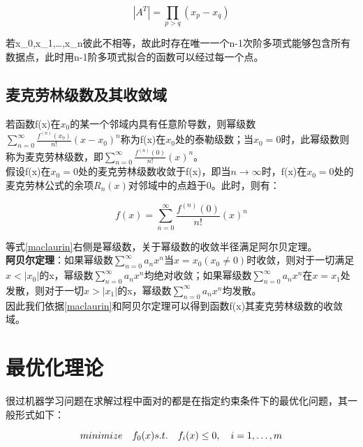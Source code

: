 \begin{equation}
\left|A^{T}\right|=\prod_{p>q}\left(x_{p}-x_{q}\right)
\end{equation}

若x_0,x_1,…,x_n彼此不相等，故此时存在唯一一个n-1次阶多项式能够包含所有数据点，此时用n-1阶多项式拟合的函数可以经过每一个点。

\subsection{麦克劳林级数及其收敛域}
若函数f(x)在$x_0$的某一个邻域内具有任意阶导数，则幂级数$\sum_{n=0}^{\infty}{\frac{f^{\left( n \right)}\left( x_0 \right)}{n!}}\left( x-x_0 \right) ^n$称为f(x)在$x_0$处的泰勒级数；当$x_0=0$时，此幂级数则称为麦克劳林级数，即$\sum_{n=0}^{\infty}{\frac{f^{\left( n \right)}\left( 0 \right)}{n!}}\left( x \right) ^n$。\\
假设f(x)在$x_0=0$处的麦克劳林级数收敛于f(x)，即当$n\rightarrow \infty $时，f(x)在$x_0=0$处的麦克劳林公式的余项$R_n(x)$对邻域中的点趋于0。此时，则有：

\begin{equation}
\label{maclaurin}
f\left( x \right) =\sum_{n=0}^{\infty}{\frac{f^{\left( n \right)}\left( 0 \right)}{n!}}\left( x \right) ^n
\end{equation}

等式\ref{maclaurin}右侧是幂级数，关于幂级数的收敛半径满足阿尔贝定理。\\
\textbf{阿贝尔定理}：如果幂级数$\sum_{n=0}^{\infty}{a_nx^n}$当$x=x_0(x_0 \ne 0)$时收敛，则对于一切满足$x<|x_0|$的x，幂级数$\sum_{n=0}^{\infty}{a_nx^n}$均绝对收敛；如果幂级数$\sum_{n=0}^{\infty}{a_nx^n}$在$x=x_1$处发散，则对于一切$x>|x_1|$的x，幂级数$\sum_{n=0}^{\infty}{a_nx^n}$均发散。\\
因此我们依据\ref{maclaurin}和阿贝尔定理可以得到函数f(x)其麦克劳林级数的收敛域。





\section{最优化理论}
很过机器学习问题在求解过程中面对的都是在指定约束条件下的最优化问题，其一般形式如下：

\begin{equation}
minimize \quad f_{0}(x)$ \\$s.t. \quad f_{i}(x) \leq 0, \quad i=1, \ldots, m
\end{equation}

